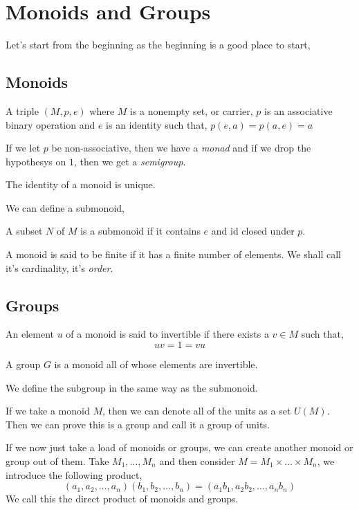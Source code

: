 

\section{Monoids and Groups}
Let's start from the beginning as the beginning is a good place to start,
\subsection{Monoids}
\begin{ndefi}[Monoid]
  A triple $(M, p, e)$ where $M$ is a nonempty set, or carrier, $p$ is an associative binary operation and $e$ is an identity such that,
  $p(e, a) = p(a, e) = a$
\end{ndefi}
If we let $p$ be non-associative, then we have a \textit{monad} and if we drop the hypothesys on $1$, then we get a \textit{semigroup}.
\begin{nlemma}
  The identity of a monoid is unique.
\end{nlemma}
We can define a submonoid,
\begin{ndefi}[Submonoid]
  A subset $N$ of $M$ is a submonoid if it contains $e$ and id closed under $p$.
\end{ndefi}
\begin{ndefi}
  A monoid is said to be finite if it has a finite number of elements. We shall call it's cardinality, it's \textit{order}.
\end{ndefi}
\subsection{Groups}
An element $u$ of a monoid is said to invertible if there exists a $v \in M$ such that,
$$ uv = 1 = vu $$

\begin{ndefi}[Group]
  A group $G$ is a monoid all of whose elements are invertible.
\end{ndefi}
We define the subgroup in the same way as the submonoid.
\begin{ndefi}
  If we take a monoid $M$, then we can denote all of the units as a set $U(M)$. Then we can prove this is a group and call it a group of units.
\end{ndefi}

If we now just take a load of monoids or groups, we can create another monoid or group out of them. Take $M_1, \dots, M_n$ and then consider $M = M_1 \times \dots \times M_n$, we introduce the following product,
$$ (a_1, a_2, \dots, a_n)(b_1, b_2, \dots, b_n) = (a_1b_1, a_2b_2, \dots, a_nb_n) $$
We call this the direct product of monoids and groups.

